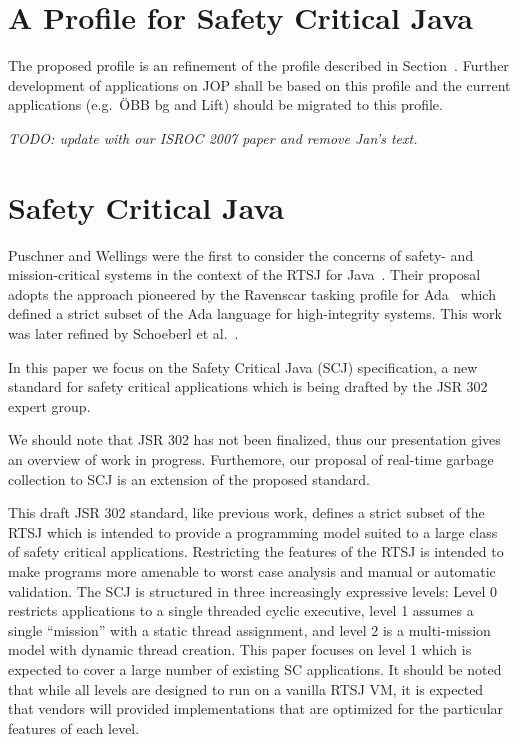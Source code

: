 
\section{A Profile for Safety Critical Java}
\label{sec:scjava}

The proposed profile is an refinement of the profile described in
Section~\label{sec:rtprof}. Further development of applications on
JOP shall be based on this profile and the current applications
(e.g.\ \"OBB bg and Lift) should be migrated to this profile.

\emph{TODO: update with our ISROC 2007 paper and remove Jan's text.}

\section{Safety Critical Java}

Puschner and Wellings were the first to consider the concerns of
safety- and mission-critical systems in the context of the RTSJ for
Java~\cite{Pusch01}. Their proposal adopts the approach pioneered by
the Ravenscar tasking profile for Ada~\cite{697453} which defined a
strict subset of the Ada language for high-integrity systems.  This
work was later refined by Schoeberl et al.~\cite{jop:scjava}.

In this paper we focus on the Safety Critical Java (SCJ)
specification, a new standard for safety critical applications which
is being drafted by the JSR 302 expert group.

We should note that JSR 302 has not been finalized, thus our
presentation gives an overview of work in progress. Furthemore, our
proposal of real-time garbage collection to SCJ is an extension of
the proposed standard.


This draft JSR 302 standard, like previous work, defines a strict
subset of the RTSJ which is intended to provide a programming model
suited to a large class of safety critical applications. Restricting
the features of the RTSJ is intended to make programs more amenable
to worst case analysis and manual or automatic validation. The SCJ
is structured in three increasingly expressive levels: Level 0
restricts applications to a single threaded cyclic executive, level
1 assumes a single ``mission'' with a static thread assignment, and
level 2 is a multi-mission model with dynamic thread creation. This
paper focuses on level 1 which is expected to cover a large number
of existing SC applications. It should be noted that while all
levels are designed to run on a vanilla RTSJ VM, it is expected that
vendors will provided implementations that are optimized for the
particular features of each level.


